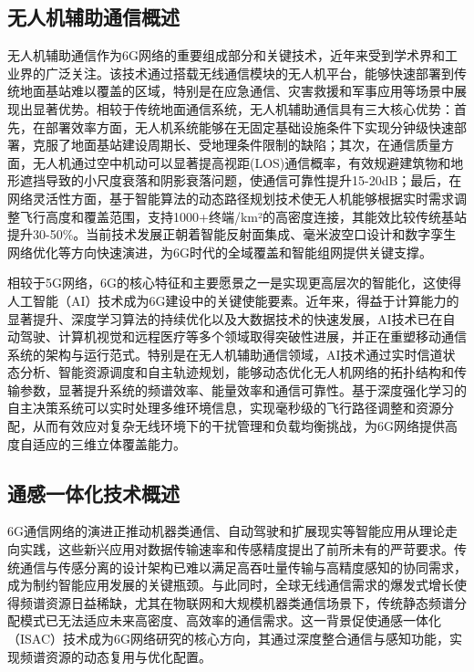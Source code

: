 \documentclass{article}
\begin{document}
    \subsection{无人机辅助通信概述}
    无人机辅助通信作为6G网络的重要组成部分和关键技术，近年来受到学术界和工业界的广泛关注\cite{mishra2022drone}。该技术通过搭载无线通信模块的无人机平台，能够快速部署到传统地面基站难以覆盖的区域，特别是在应急通信、灾害救援和军事应用等场景中展现出显著优势。相较于传统地面通信系统，无人机辅助通信具有三大核心优势：首先，在部署效率方面，无人机系统能够在无固定基础设施条件下实现分钟级快速部署，克服了地面基站建设周期长、受地理条件限制的缺陷；其次，在通信质量方面，无人机通过空中机动可以显著提高视距(LOS)通信概率，有效规避建筑物和地形遮挡导致的小尺度衰落和阴影衰落问题，使通信可靠性提升15-20dB；最后，在网络灵活性方面，基于智能算法的动态路径规划技术使无人机能够根据实时需求调整飞行高度和覆盖范围，支持1000+终端/km²的高密度连接，其能效比较传统基站提升30-50\%。当前技术发展正朝着智能反射面集成、毫米波空口设计和数字孪生网络优化等方向快速演进，为6G时代的全域覆盖和智能组网提供关键支撑。

    相较于5G网络，6G的核心特征和主要愿景之一是实现更高层次的智能化，这使得人工智能（AI）技术成为6G建设中的关键使能要素。近年来，得益于计算能力的显著提升、深度学习算法的持续优化以及大数据技术的快速发展，AI技术已在自动驾驶、计算机视觉和远程医疗等多个领域取得突破性进展\cite{patel2007applications}，并正在重塑移动通信系统的架构与运行范式。特别是在无人机辅助通信领域，AI技术通过实时信道状态分析、智能资源调度和自主轨迹规划，能够动态优化无人机网络的拓扑结构和传输参数，显著提升系统的频谱效率、能量效率和通信可靠性。基于深度强化学习的自主决策系统可以实时处理多维环境信息，实现毫秒级的飞行路径调整和资源分配，从而有效应对复杂无线环境下的干扰管理和负载均衡挑战，为6G网络提供高度自适应的三维立体覆盖能力。


    
    \subsection{通感一体化技术概述}

    6G通信网络的演进正推动机器类通信、自动驾驶和扩展现实等智能应用从理论走向实践，这些新兴应用对数据传输速率和传感精度提出了前所未有的严苛要求。传统通信与传感分离的设计架构已难以满足高吞吐量传输与高精度感知的协同需求，成为制约智能应用发展的关键瓶颈。与此同时，全球无线通信需求的爆发式增长使得频谱资源日益稀缺，尤其在物联网和大规模机器类通信场景下，传统静态频谱分配模式已无法适应未来高密度、高效率的通信需求。这一背景促使通感一体化（ISAC）技术成为6G网络研究的核心方向\cite{wei2023integrated}，其通过深度整合通信与感知功能，实现频谱资源的动态复用与优化配置。
\end{document}
